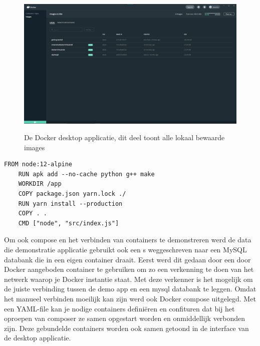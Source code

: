 \begin{figure}[h]
    \includegraphics[width=\linewidth]{img/dockerImg.png}
    \label{fig:Dockerdesktop}
    \caption[De Docker desktop applicatie]{De Docker desktop applicatie, dit deel toont alle lokaal bewaarde images}
    \centering
\end{figure}
\begin{lstlisting}[caption=inhoud van de Dockerfile,label=lst:Dockerfile]
    FROM node:12-alpine
    RUN apk add --no-cache python g++ make
    WORKDIR /app
    COPY package.json yarn.lock ./
    RUN yarn install --production
    COPY . .
    CMD ["node", "src/index.js"]
\end{lstlisting}


Om ook compose en het verbinden van containers te demonstreren werd de data die demonstratie applicatie gebruikt ook een s weggeschreven naar een MySQL databank die in een eigen container draait. Eerst werd dit gedaan door een door Docker aangeboden container te gebruiken om zo een verkenning te doen van het netwerk waarop je Docker instantie staat. Met deze verkenner is het mogelijk om de juiste verbinding tussen de demo app en een mysql databank te leggen. Omdat het manueel verbinden moeilijk kan zijn werd ook Docker compose uitgelegd. Met een YAML-file kan je nodige containers definiëren en confituren dat bij het oproepen van composer ze samen opgestart worden en onmiddellijk verbonden zijn. Deze gebundelde containers worden ook samen getoond in de interface van de desktop applicatie.


